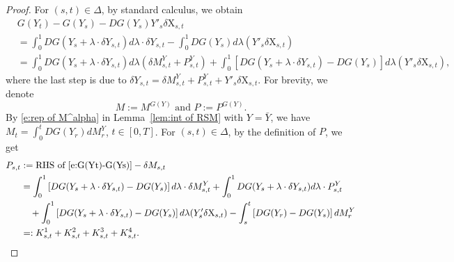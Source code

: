 \documentclass[11pt,reqno]{amsart}
\numberwithin{equation}{section}
\begin{document}
\begin{proof}
For $(s,t) \in \Delta$, by standard calculus, we obtain 
\begin{align}\nonumber
&G(Y_{t}) - G(Y_{s}) - D G(Y_{s}) Y'_{s} \delta\mathrm X_{s,t}\\ \label{e:G(Yt)-G(Ys)}
&= \int_{0}^{1} D G(Y_{s} + \lambda\cdot \delta Y_{s,t} )d\lambda \cdot \delta Y_{s,t} - \int_{0}^{1} D G(Y_{s}) d\lambda (Y'_{s} \delta\mathrm X_{s,t})\\ \nonumber
&= \int_{0}^{1} D G(Y_{s} + \lambda\cdot \delta Y_{s,t} ) d\lambda (\delta M^{Y}_{s,t} + P^{Y}_{s,t}) + \int_{0}^{1} \left[ D G(Y_{s} + \lambda \cdot \delta Y_{s,t} ) - D G(Y_{s})\right] d\lambda (Y'_{s} \delta\mathrm X_{s,t}),
\end{align}
where the last step is due to $\delta Y_{s,t} = \delta M^{Y}_{s,t} + P^Y_{s,t} + Y'_{s} \delta \mathrm X_{s,t}$. For brevity, we denote 
\begin{equation*}
M := M^{G(Y)}\text{ and }P := P^{G(Y)}.
\end{equation*}
By \eqref{e:rep of M^alpha} in Lemma~\ref{lem:int of RSM} with $Y = \bar Y$, we have $M_t = \int_{0}^{t} D G(Y_{r}) d M^{Y}_{r}$, $t \in [0,T]$. 
For $(s,t)\in \Delta$, by the definition of $P$, we get
\begin{equation*}
\begin{aligned}
P_{s,t}&:=\text{RHS of \eqref{e:G(Yt)-G(Ys)}} - \delta M_{s,t}\\
&= \int_{0}^{1}\left[D G(Y_{s} + \lambda\cdot \delta Y_{s,t}) - D G(Y_{s})\right]d\lambda \cdot \delta M^{Y}_{s,t} + \int_{0}^{1} D G(Y_s + \lambda \cdot \delta Y_{s,t} )d\lambda \cdot  P^Y_{s,t}\\
&\quad + \int_{0}^{1} \left[D G(Y_{s} + \lambda \cdot \delta Y_{s,t} ) - D G(Y_{s})\right] d\lambda (Y'_{s} \delta\mathrm X_{s,t}) - \int_{s}^{t} \left[D G(Y_{r}) - D G(Y_{s})\right]dM^{Y}_{r}\\
&=: K^1_{s,t} + K^2_{s,t} + K^{3}_{s,t} + K^{4}_{s,t}.
\end{aligned}
\end{equation*}


\end{proof}
\end{document}
